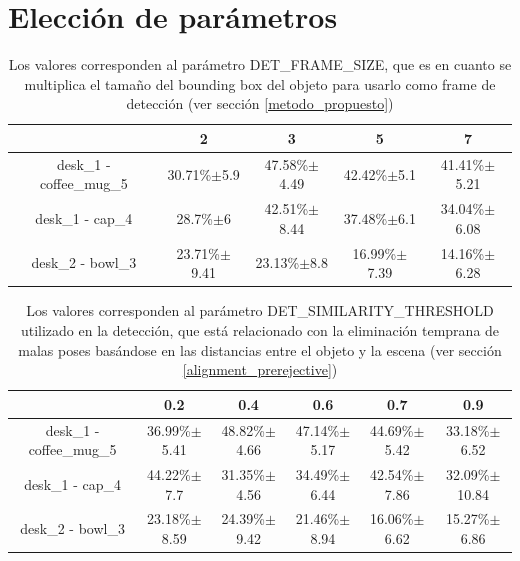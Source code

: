 \section{Elección de parámetros}\label{eleccion_parametros}
\begin{table}[h]
	\begin{tabular}{|c|c|c|c|c|}
	\hline 
	 & 2 & 3 & 5 & 7 \\ 
	\hline 
	desk\_1 - coffee\_mug\_5 & 30.71\%$\pm$5.9 & 47.58\%$\pm$4.49 & 42.42\%$\pm$5.1 & 41.41\%$\pm$5.21 \\ 
	\hline 
	desk\_1 - cap\_4 & 28.7\%$\pm$6 & 42.51\%$\pm$8.44 & 37.48\%$\pm$6.1 & 34.04\%$\pm$6.08 \\ 
	\hline 
	desk\_2 - bowl\_3 & 23.71\%$\pm$9.41 & 23.13\%$\pm$8.8 & 16.99\%$\pm$7.39 & 14.16\%$\pm$6.28 \\ 
	\hline 
	\end{tabular}
	\caption{Los valores corresponden al parámetro DET\_FRAME\_SIZE, que es en cuanto se multiplica el tamaño del bounding box del objeto para usarlo como frame de detección (ver sección \ref{metodo_propuesto})}
\end{table}

\begin{table}[h]
	\begin{tabular}{|c|c|c|c|c|c|}
	\hline 
	 & 0.2 & 0.4 & 0.6 & 0.7 & 0.9 \\ 
	\hline 
	desk\_1 - coffee\_mug\_5 & 36.99\%$\pm$5.41 & 48.82\%$\pm$4.66 & 47.14\%$\pm$5.17 & 44.69\%$\pm$5.42 & 33.18\%$\pm$6.52\\ 
	\hline 
	desk\_1 - cap\_4 & 44.22\%$\pm$7.7 & 31.35\%$\pm$4.56 & 34.49\%$\pm$6.44 & 42.54\%$\pm$7.86 & 32.09\%$\pm$10.84\\ 
	\hline 
	desk\_2 - bowl\_3 & 23.18\%$\pm$8.59 & 24.39\%$\pm$9.42 & 21.46\%$\pm$8.94 & 16.06\%$\pm$6.62 & 15.27\%$\pm$6.86\\ 
	\hline 
	\end{tabular}
	\caption{Los valores corresponden al parámetro DET\_SIMILARITY\_THRESHOLD utilizado en la detección, que está relacionado con la eliminación temprana de malas poses basándose en las distancias entre el objeto y la escena (ver sección \ref{alignment_prerejective})}
\end{table}

